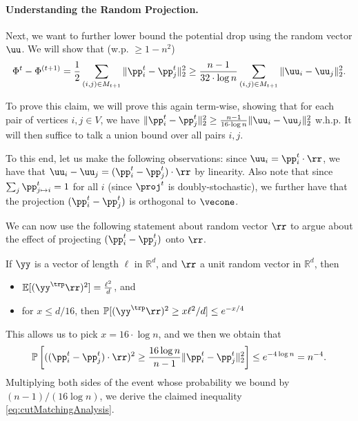 \paragraph{Understanding the Random Projection.} Next, we want to further lower bound the potential drop using the random vector $\uu$. We will show that (w.p. $\geq 1-n^2$)
\begin{align}\label{eq:cutMatchingAnalysis}
     \Phi^{t} - \Phi^{(t+1)} = \frac{1}{2} \sum_{(i,j) \in M_{t+1}} \|\pp_{i}^t - \pp_{j}^t \|_2^2 \geq \frac{n-1}{32 \cdot \log n} \sum_{(i,j) \in M_{t+1}} \|\uu_i - \uu_j\|^2_2.
\end{align}

To prove this claim, we will prove this again term-wise, showing that for each pair of vertices $i,j \in V$, we have $\|\pp_{i}^t - \pp_{j}^t \|_2^2 \geq \frac{n-1}{16 \cdot \log n} \|\uu_i - \uu_j\|^2_2$ w.h.p. It will then suffice to talk a union bound over all pairs $i,j$. 

To this end, let us make the following observations: since $\uu_i = \pp_i^t \cdot \rr$, we have that $\uu_i - \uu_j = (\pp_i^t - \pp_j^t) \cdot \rr$ by linearity. Also note that since $\sum_j \pp_{j \mapsto i}^t = 1$ for all $i$ (since $\proj^t$ is doubly-stochastic), we further have that the projection $(\pp_i^t - \pp_j^t)$ is orthogonal to $\vecone$.

We can now use the following statement about random vector $\rr$ to argue about the effect of projecting $(\pp_i^t - \pp_j^t)$ onto $\rr$. 

\begin{theorem}\label{thm:factsGaussianAnnulus}
If $\yy$ is a vector of length $\ell$ in $\mathbb{R}^d$, and $\rr$ a unit random vector in $\mathbb{R}^d$, then
\begin{itemize}
    \item $\mathbb{E}[(\yy^\trp \rr)^2] = \frac{\ell^2}{d}$, and
    \item for $x \leq d/16$, then $\mathbb{P}[(\yy^\trp \rr)^2 \geq x\ell^2/d] \leq e^{-x/4}$
\end{itemize}
\end{theorem}

This allows us to pick $x = 16 \cdot \log n$, and we then we obtain that
\[
    \mathbb{P}\left[ ((\pp_i^t - \pp_j^t) \cdot \rr)^2 \geq  \frac{16 \log n}{n-1} \|\pp_i^t - \pp_j^t\|_2^2\right] \leq e^{-4 \log n} = n^{-4}.
\]
Multiplying both sides of the event whose probability we bound by $(n-1)/(16 \log n)$, we derive the claimed inequality  \ref{eq:cutMatchingAnalysis}.

